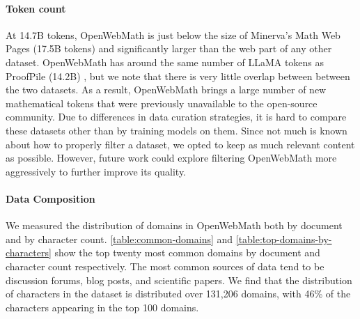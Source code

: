 \paragraph{Token count} At 14.7B tokens, OpenWebMath is just below the size of Minerva's Math Web Pages (17.5B tokens) \citet{lewkowycz2022solving} and significantly larger than the web part of any other dataset. OpenWebMath has around the same number of LLaMA tokens as ProofPile (14.2B) \citep{azerbayev2023proofnet}, but we note that there is very little overlap between between the two datasets. As a result, OpenWebMath brings a large number of new mathematical tokens that were previously unavailable to the open-source community. Due to differences in data curation strategies, it is hard to compare these datasets other than by training models on them. Since not much is known about how to properly filter a dataset, we opted to keep as much relevant content as possible. However, future work could explore filtering OpenWebMath more aggressively to further improve its quality.

\paragraph{Data Composition} We measured the distribution of domains in OpenWebMath both by document and by character count. \autoref{table:common-domains} and \autoref{table:top-domains-by-characters} show the top twenty most common domains by document and character count respectively. The most common sources of data tend to be discussion forums, blog posts, and scientific papers. We find that the distribution of characters in the dataset is distributed over 131,206 domains, with 46\% of the characters appearing in the top 100 domains.

